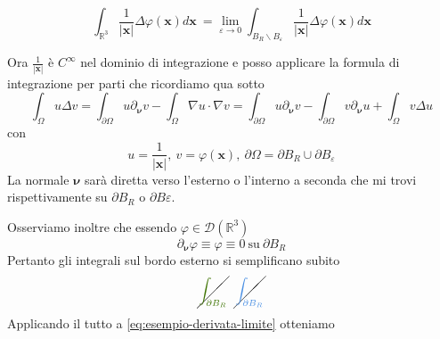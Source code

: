 \documentclass[10pt,a4paper,twoside,openright]{book}
\newcommand{\x}{\mathbf{x}}
\begin{document}
\begin{enumerate}
\begin{figure}[htpb]
\begin{tikzpicture}[x=0.75pt,y=0.75pt,yscale=-1,xscale=1]
	      		
	      	\end{tikzpicture}
	      \end{figure}
	      \FloatBarrier
	      \begin{equation}
	      	\int _{\mathbb{R}^{3}}\frac{1}{| \x| } \Delta \varphi (\x) d\x \ =\lim _{\varepsilon \rightarrow 0}\int _{B_{R} \backslash B_{\varepsilon }}\frac{1}{| \x| } \Delta \varphi (\x) d\x
	      	\label{eq:esempio-derivata-limite}
	      \end{equation}
\end{enumerate}

Ora $\displaystyle \frac{1}{| \x| }$ è $\displaystyle C^{\infty }$ nel dominio di integrazione e posso applicare la formula di integrazione per parti che ricordiamo qua sotto
\begin{equation*}
	\int _{\Omega } u\Delta v=\int _{\partial \Omega } u\partial _{\bm{\nu}} v-\int _{\Omega } \nabla u\cdotp \nabla v=\int _{\partial \Omega } u\partial _{\bm{\nu }} v-\int _{\partial \Omega } v\partial _{\bm{\nu }} u+\int _{\Omega } v\Delta u
\end{equation*}
con 
\begin{equation*}
	u=\frac{1}{| \x| } ,\ v=\varphi (\x) ,\ \partial \Omega =\partial B_{R} \cup \partial B_{\varepsilon }
\end{equation*}
La normale $\displaystyle \bm{\nu }$ sarà diretta verso l'esterno o l'interno a seconda che mi trovi rispettivamente su $\displaystyle \partial B_{R}$ o $\displaystyle \partial B\varepsilon $.

Osserviamo inoltre che essendo $\displaystyle \varphi \in \mathcal{D}\left(\mathbb{R}^{3}\right)$
\begin{equation*}
	\partial _{\bm{\nu }} \varphi \equiv \varphi \equiv 0\ \text{su} \ \partial B_{R}
\end{equation*}
Pertanto gli integrali sul bordo esterno si semplificano subito
\begin{equation*}
	\cancel{\textcolor[rgb]{0.25,0.46,0.02}{\int _{\partial B_{R}}}} \ \ \cancel{\textcolor[rgb]{0.29,0.56,0.89}{\int _{\partial B_{R}}}}
\end{equation*}
Applicando il tutto a \eqref{eq:esempio-derivata-limite} otteniamo
\end{document}
